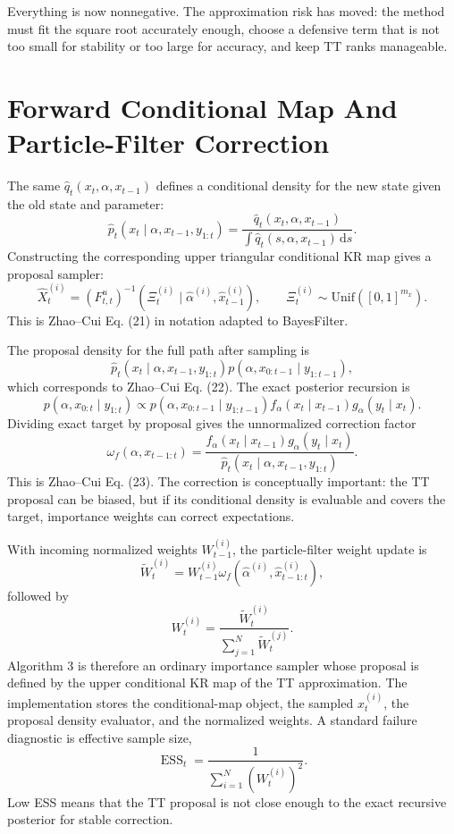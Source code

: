 \documentclass[11pt]{article}
\newcommand{\dd}{\,\mathrm d}
\begin{document}
Everything is now nonnegative.  The approximation risk has moved: the method
must fit the square root accurately enough, choose a defensive term that is not
too small for stability or too large for accuracy, and keep TT ranks manageable.

\section{Forward Conditional Map And Particle-Filter Correction}

The same \(\widehat q_t(x_t,\alpha,x_{t-1})\) defines a conditional density for
the new state given the old state and parameter:
\[
    \widehat p_t(x_t\mid \alpha,x_{t-1},y_{1:t})
    =
    \frac{\widehat q_t(x_t,\alpha,x_{t-1})}
    {\int \widehat q_t(s,\alpha,x_{t-1})\dd s}.
    \tag{F1}
\]
Constructing the corresponding upper triangular conditional KR map gives a
proposal sampler:
\[
    \widehat X_t^{(i)}
    =
    (F_{t,t}^{u})^{-1}
    \left(\Xi_t^{(i)}\mid \widehat\alpha^{(i)},\widehat x_{t-1}^{(i)}\right),
    \qquad
    \Xi_t^{(i)}\sim\mathrm{Unif}([0,1]^{m_x}).
    \tag{F2}
\]
This is Zhao--Cui Eq. (21) in notation adapted to BayesFilter.

The proposal density for the full path after sampling is
\[
    \widehat p_t(x_t\mid \alpha,x_{t-1},y_{1:t})
    p(\alpha,x_{0:t-1}\mid y_{1:t-1}),
    \tag{F3}
\]
which corresponds to Zhao--Cui Eq. (22).  The exact posterior recursion is
\[
    p(\alpha,x_{0:t}\mid y_{1:t})
    \propto
    p(\alpha,x_{0:t-1}\mid y_{1:t-1})
    f_\alpha(x_t\mid x_{t-1})
    g_\alpha(y_t\mid x_t).
\]
Dividing exact target by proposal gives the unnormalized correction factor
\[
    \omega_f(\alpha,x_{t-1:t})
    =
    \frac{
    f_\alpha(x_t\mid x_{t-1})g_\alpha(y_t\mid x_t)}
    {\widehat p_t(x_t\mid \alpha,x_{t-1},y_{1:t})}.
    \tag{F4}
\]
This is Zhao--Cui Eq. (23).  The correction is conceptually important: the TT
proposal can be biased, but if its conditional density is evaluable and covers
the target, importance weights can correct expectations.

With incoming normalized weights \(W_{t-1}^{(i)}\), the particle-filter weight
update is
\[
    \widetilde W_t^{(i)}
    =
    W_{t-1}^{(i)}
    \omega_f(\widehat\alpha^{(i)},\widehat x_{t-1:t}^{(i)}),
    \tag{F5}
\]
followed by
\[
    W_t^{(i)}
    =
    \frac{\widetilde W_t^{(i)}}
    {\sum_{j=1}^{N}\widetilde W_t^{(j)}}.
    \tag{F6}
\]
Algorithm 3 is therefore an ordinary importance sampler whose proposal is
defined by the upper conditional KR map of the TT approximation.  The
implementation stores the conditional-map object, the sampled \(x_t^{(i)}\),
the proposal density evaluator, and the normalized weights.  A standard failure
diagnostic is effective sample size,
\[
    \operatorname{ESS}_t
    =
    \frac{1}{\sum_{i=1}^{N}(W_t^{(i)})^2}.
    \tag{F7}
\]
Low ESS means that the TT proposal is not close enough to the exact recursive
posterior for stable correction.
\end{document}
